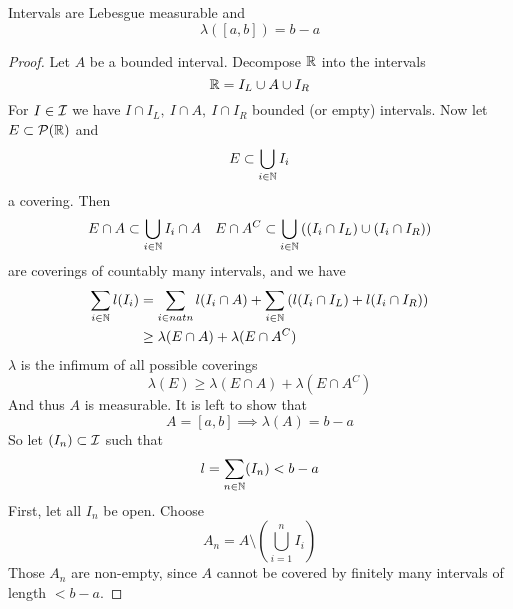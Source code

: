 \documentclass[../../script.tex]{subfiles}
\begin{document}
\begin{thm}
    Intervals are Lebesgue measurable and 
    \[
        \lambda([a, b]) = b - a
    \]
\end{thm}
\begin{proof}
    Let $A$ be a bounded interval. Decompose $\realn$ into the intervals 
    \begin{equation}
        \realn = I_L \cup A \cup I_R
    \end{equation}
    For $I \in \intervals$ we have $I \cap I_L, ~I \cap A, ~I \cap I_R$ bounded (or empty) intervals.
    Now let $E \subset \powerset(\realn)$ and 
    \begin{equation}
        E \subset \bigcup_{i \in \natn}I_i
    \end{equation}
    a covering. Then 
    \begin{align}
        E \cap A \subset \bigcup_{i \in \natn} I_i \cap A && E \cap A^C \subset \bigcup_{i \in \natn} \left((I_i \cap I_L) \cup (I_i \cap I_R)\right)
    \end{align}
    are coverings of countably many intervals, and we have 
    \begin{equation}
        \begin{split}
            \sum_{i \in \natn} l(I_i) &= \sum_{i \in natn} l(I_i \cap A) + \sum_{i \in \natn} \left(l(I_i \cap I_L) + l(I_i \cap I_R)\right) \\
            &\ge \lambda(E \cap A) + \lambda(E \cap A^C)
        \end{split}
    \end{equation}
    $\lambda$ is the infimum of all possible coverings 
    \begin{equation}
        \lambda(E) \ge \lambda(E \cap A) + \lambda(E \cap A^C)
    \end{equation}
    And thus $A$ is measurable. 
    It is left to show that 
    \begin{equation}
        A = [a, b] \implies \lambda(A) = b - a
    \end{equation}
    So let $\anyseqdef[I]{\intervals}$ such that 
    \begin{equation}
        l = \sum_{n \in \natn} (I_n) < b - a
    \end{equation}
    First, let all $I_n$ be open. Choose 
    \begin{equation}
        A_n = A \setminus \left(\bigcup_{i=1}^n I_i \right)
    \end{equation}
    Those $A_n$ are non-empty, since $A$ cannot be covered by finitely many intervals of length $< b - a$.

\end{proof}
\end{document}
